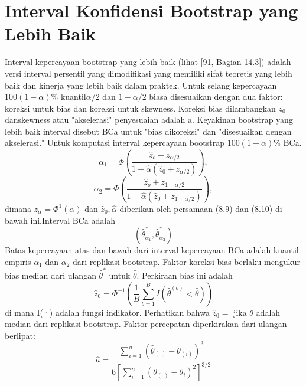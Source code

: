 \documentclass[a4paper,12pt]{article}
\theoremstyle{definition}
\begin{document}
\section{Interval Konfidensi Bootstrap yang Lebih Baik}
 Interval kepercayaan bootstrap yang lebih baik (lihat [91, Bagian 14.3]) adalah versi interval persentil yang dimodifikasi yang memiliki sifat teoretis yang lebih baik dan
kinerja yang lebih baik dalam praktek. Untuk selang kepercayaan $100(1-\alpha )$\% kuantil$\alpha /2$ dan $1-\alpha /2$ biasa disesuaikan dengan dua faktor: koreksi untuk bias dan koreksi untuk skewness. Koreksi bias dilambangkan $z_{0}$ danskewness atau "akselerasi" penyesuaian adalah a. Keyakinan bootstrap yang lebih baik
interval disebut BCa untuk "bias dikoreksi" dan "disesuaikan dengan akselerasi."
Untuk komputasi interval kepercayaan bootstrap $100(1-\alpha )$\% BCa. 
\begin{equation}
    \alpha _{1}=\Phi (\frac{\widehat{z}_{o}+z_{\alpha /2}}{1-\widehat{\alpha}(\widehat{z}_{0}+z_{\alpha /2})}),
\end{equation}
\begin{equation}
    \alpha _{2}=\Phi (\frac{\widehat{z}_{o}+z_{1-\alpha /2}}{1-\widehat{\alpha}(\widehat{z}_{0}+z_{1-\alpha /2})}),
\end{equation}
dimana $z_{\alpha }=\Phi ^{1}(\alpha )$ dan $\widehat{z}_{0},\widehat{\alpha }$ diberikan oleh persamaan (8.9) dan (8.10) di bawah ini.Interval BCa adalah
\begin{equation*}
    (\widehat{\theta }_{\alpha _{1}}^{*},\widehat{\theta }_{\alpha _{2}}^{*})
\end{equation*}
Batas kepercayaan atas dan bawah dari interval kepercayaan BCa adalah
kuantil empiris $\alpha _{1}$ dan $\alpha _{2}$ dari replikasi bootstrap.
Faktor koreksi bias berlaku mengukur bias median dari ulangan $\widehat{\theta }^{*}$ untuk $\widehat{\theta }$. Perkiraan bias ini adalah
\begin{equation}
    \widehat{z}_{0}=\Phi ^{-1}(\frac{1}{B}\sum_{b=1}^{B}I(\widehat{\theta }^{(b)}< \widehat{\theta }))
\end{equation}
di mana I(·) adalah fungsi indikator. Perhatikan bahwa $\widehat{z}_{0}=$ jika $\theta $ adalah median dari
replikasi bootstrap. Faktor percepatan diperkirakan dari ulangan berlipat:
\begin{equation}
   \widehat{a}=\frac{\sum_{i=1}^{n}(\widehat{\theta }_{{(.)}}-\theta _{(i)})^{3}}{6[\sum_{i=1}^{n}(\overline{\theta }_{(.)}-\theta _{i})^{2}]^{3/2}} 
\end{equation}
\end{document}
